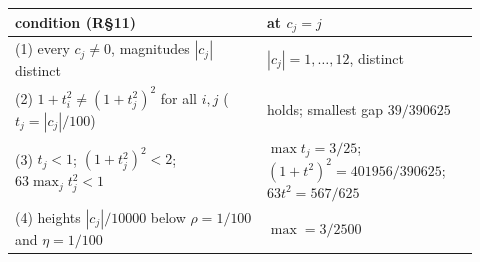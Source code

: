 \begin{tabular}{L{0.5\linewidth} L{0.42\linewidth}}
\toprule
condition (R\S11) & at $c_j=j$ \\
\midrule
(1) every $c_j\ne0$, magnitudes $|c_j|$ distinct & $|c_j|=1,\dots,12$, distinct \\
(2) $1+t_i^2\ne(1+t_j^2)^2$ for all $i,j$ ($t_j=|c_j|/100$) & holds; smallest gap $39/390625$ \\
(3) $t_j<1$; $(1+t_j^2)^2<2$; $63\max_j t_j^2<1$ & $\max t_j=3/25$; $(1+t^2)^2=401956/390625$; $63t^2=567/625$ \\
(4) heights $|c_j|/10000$ below $\rho=1/100$ and $\eta=1/100$ & $\max=3/2500$ \\
\bottomrule
\end{tabular}
